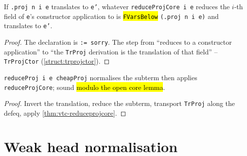 \begin{theorem}
  \label{thm:vtc-reduceprojcore}
  \leanok

   If \texttt{.proj n i e} translates to \texttt{e'}, whatever
  \texttt{reduceProjCore i e} reduces the $i$-th field of \texttt{e}'s constructor application to
  is \hl{\texttt{FVarsBelow}} \texttt{(.proj n i e)} and translates to \texttt{e'}.
\end{theorem}
\begin{proof}
  \stSorry{} The declaration is \texttt{:= sorry}.
   The step from ``reduces to a constructor application'' to ``the
  \texttt{TrProj} derivation is the translation of that field'' -- \texttt{TrProjCtor}
  (\ref{struct:trprojctor}).
\end{proof}

\begin{lemma}
  \label{thm:vtc-reduceproj}
  \leanok

   \texttt{reduceProj i e cheapProj} normalises the subterm then applies
  \texttt{reduceProjCore}; sound \hl{modulo the open core lemma}.
\end{lemma}
\begin{proof}
  \leanok
   Invert the translation, reduce the subterm, transport \texttt{TrProj} along the
  defeq, apply \ref{thm:vtc-reduceprojcore}.
\end{proof}

\section{Weak head normalisation}

